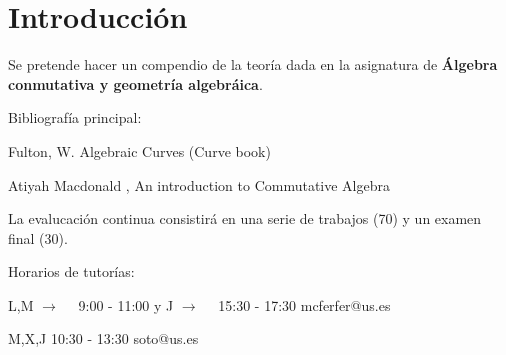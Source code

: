 \chapter*{Introducción}

Se pretende hacer un compendio de la teoría dada en la asignatura de
\textbf{Álgebra conmutativa y geometría algebráica}.

Bibliografía principal:

\begin{itemize*}
\item Fulton, W. Algebraic Curves (Curve book)
\item Atiyah Macdonald , An introduction to Commutative Algebra
\end{itemize*}

La evalucación continua consistirá en una serie de trabajos (70) y un examen final (30).


Horarios de tutorías:

\begin{itemize*}
\item L,M $\rightarrow \quad $ 9:00 - 11:00 y
 J   $\rightarrow \quad $ 15:30 - 17:30
mcferfer@us.es
\item M,X,J 10:30 - 13:30 soto@us.es
\end{itemize*}